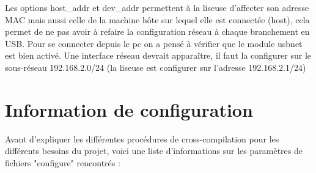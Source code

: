 Les options host_addr et dev_addr permettent à la liseuse d'affecter son adresse MAC mais aussi celle de la machine hôte sur lequel elle est connectée (host), cela permet de ne pas avoir à refaire la configuration réseau à chaque branchement en USB.	
	Pour se connecter depuis le pc on a pensé à vérifier que le module usbnet est bien activé.	
	Une interface réseau devrait apparaître, il faut la configurer sur le sous-réseau 192.168.2.0/24 (la liseuse est configurer sur l'adresse 192.168.2.1/24)

\newpage

\section{Information de configuration}

Avant d'expliquer les différentes procédures de cross-compilation pour les différents besoins du projet, voici une liste d'informations sur les paramètres de fichiers "configure" rencontrés :

